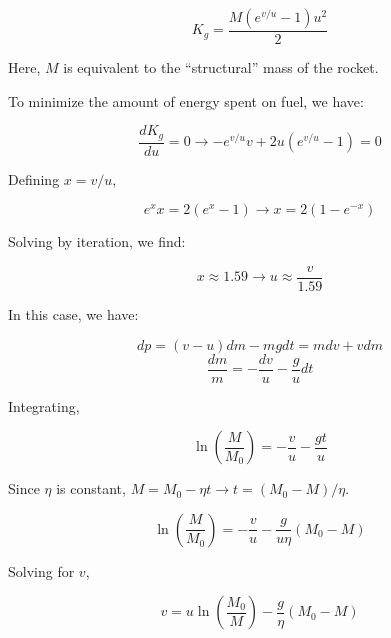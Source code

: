 \documentclass[11pt]{article}
\begin{document}
\begin{pproblem}
\begin{pssolution*}{}{}
\begin{alternativas}
            \[K_g = \frac{M(e^{v/u}-1)u^2}{2}\]

            Here, \(M\) is equivalent to the ``structural'' mass of the rocket.

            To minimize the amount of energy spent on fuel, we have:

            \[\frac{dK_g}{du}=0  \rightarrow -e^{v/u}v +2u(e^{v/u}-1)=0\]

            Defining \(x=v/u\),

            \[e^xx = 2(e^x-1) \rightarrow x = 2(1-e^{-x})\]

            Solving by iteration, we find:

            \[x \approx 1.59 \rightarrow \boxed{u \approx \frac{v}{1.59}} \]

            \item In this case, we have:
            
            \[dp = (v-u)dm - mgdt = mdv +vdm\]
            \[\frac{dm}{m} = -\frac{dv}{u} - \frac{g}{u}dt\]

            Integrating,

            \[\ln\left(\frac{M}{M_0}\right) = -\frac{v}{u} - \frac{gt}{u}\]

            Since \(\eta\) is constant, \(M = M_0 -\eta t \rightarrow t = (M_0-M)/\eta\).

            \[\ln\left(\frac{M}{M_0}\right) = -\frac{v}{u} - \frac{g}{u\eta}(M_0-M)\]

            Solving for \(v\),

            \[\boxed{v = u\ln\left(\frac{M_0}{M}\right)-\frac{g}{\eta}(M_0-M)}\]
        \end{alternativas}
    \end{pssolution*}
\end{pproblem}  
\end{document}
